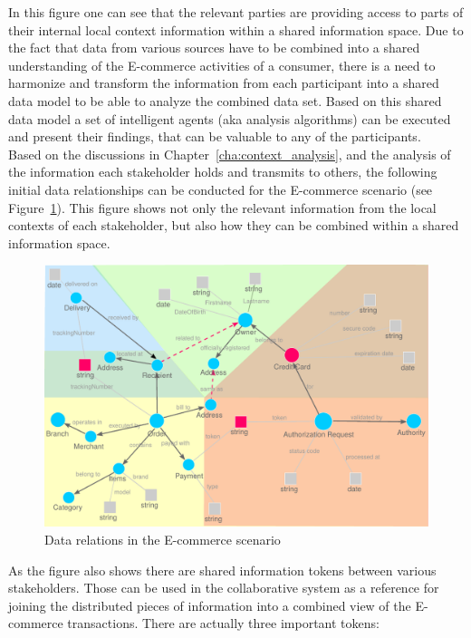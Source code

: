 In this figure one can see that the relevant parties are providing access to parts of their internal local context information within a shared information space. Due to the fact that data from various sources have to be combined into a shared understanding of the \gls{E-commerce} activities of a consumer, there is a need to harmonize and transform the information from each participant into a shared data model to be able to analyze the combined data set. Based on this shared data model a set of intelligent agents (aka analysis algorithms) can be executed and present their findings, that can be valuable to any of the participants. \\

Based on the discussions in Chapter~\ref{cha:context_analysis}, and the analysis of the information each stakeholder holds and transmits to others, the following initial data relationships can be conducted for the \gls{E-commerce} scenario (see Figure~\ref{fig:images_data_model}). This figure shows not only the relevant information from the local contexts of each stakeholder, but also how they can be combined within a shared information space. \\

\begin{figure}[!ht]
  \centering
  \includegraphics[width=0.9\columnwidth]{images/ontology_scenario_1.pdf}
  \caption[Data relations in the E-commerce scenario]{Data relations in the \gls{E-commerce} scenario\protect\footnotemark}
\label{fig:images_data_model}
\end{figure}

As the figure also shows there are shared information tokens between various stakeholders. Those can be used in the collaborative system as a reference for joining the distributed pieces of information into a combined view of the \gls{E-commerce} transactions. There are actually three important tokens: \@

